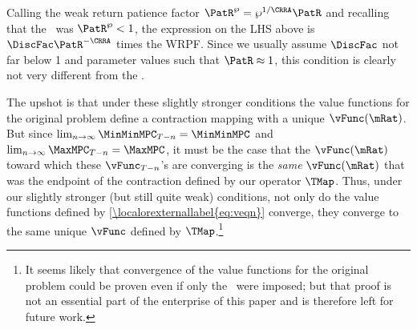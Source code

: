 \documentclass[\econtexRoot/BufferStockTheory]{subfiles}
\begin{document}
Calling the weak return patience factor $\PatR^{\wp}=\wp^{1/\CRRA}\PatR$ and
recalling that the \WRIC~was $\PatR^{\wp}<1$, the expression on the LHS
above is $\DiscFac \PatR^{-\CRRA}$ times the WRPF.  Since we usually assume $\DiscFac$ not far below 1 and
parameter values such that $\PatR \approx 1$, this condition is clearly not very
different from the \WRIC.

The upshot is that under these slightly stronger conditions the value
functions for the original problem define a contraction mapping with a
unique $\vFunc(\mRat)$.  But since $\lim_{n \rightarrow \infty}
\MinMinMPC_{T-n} = \MinMinMPC$ and $\lim_{n \rightarrow \infty}
\MaxMPC_{T-n} = \MaxMPC$, it must be the case that the $\vFunc(\mRat)$
toward which these $\vFunc_{T-n}$'s are converging is the {\it same}
$\vFunc(\mRat)$ that was the endpoint of the contraction defined by
our operator $\TMap$.  Thus, under our slightly stronger (but still
quite weak) conditions, not only do the value functions defined by
\eqref{\localorexternallabel{eq:veqn}} converge, they converge to the same unique $\vFunc$
defined by $\TMap$.\footnote{It seems likely that convergence of the
  value functions for the original problem could be proven even if
  only the \WRIC~were imposed; but that proof is not an essential part
  of the enterprise of this paper and is therefore left for future
  work.}

\onlyinsubfile{}
\end{document}
